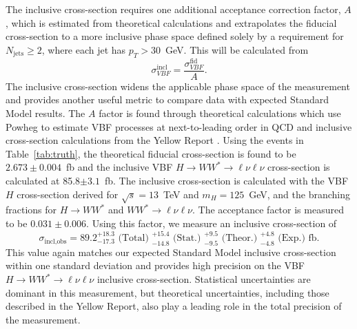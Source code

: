 The inclusive cross-section requires one additional acceptance correction factor, $A$, which is estimated from theoretical calculations and extrapolates the fiducial cross-section to a more inclusive phase space defined solely by a requirement for $N_{\text{jets}}\geq2$, where each jet has $p_T>30$~GeV. This will be calculated from
\begin{equation}
\sigma_{VBF}^{\text{incl}} = \frac{\sigma_{VBF}^{\text{fid}}}{A}.
\end{equation}
The inclusive cross-section widens the applicable phase space of the measurement and provides another useful metric to compare data with expected Standard Model results. The $A$ factor is found through theoretical calculations which use Powheg to estimate VBF processes at next-to-leading order in QCD and inclusive cross-section calculations from the Yellow Report \cite{LHCCrossSectionWG}. Using the events in Table~\ref{tab:truth}, the theoretical fiducial cross-section is found to be $2.673\pm0.004$~fb and the inclusive VBF $H\rightarrow WW^*\rightarrow \ell\nu\ell\nu$ cross-section is calculated at 85.8$\pm 3.1$~fb. The inclusive cross-section is calculated with the VBF $H$ cross-section derived for $\sqrt{s}=13$~TeV and $m_H=125$~GeV, and the branching fractions for $H\rightarrow WW^*$ and $WW^*\rightarrow\ell\nu\ell\nu$.  The acceptance factor is measured to be $0.031 \pm 0.006$. Using this factor, we measure an inclusive cross-section of
\begin{equation}
\sigma_{\text{incl,obs}} = 89.2^{+18.3}_{-17.3} \text{ (Total) } ^{+15.4}_{-14.8} \text{ (Stat.) } ^{+9.5}_{-9.5} \text{ (Theor.) } ^{+4.8}_{-4.8} \text{ (Exp.)} \text{ fb}.
\end{equation} 
This value again matches our expected Standard Model inclusive cross-section within one standard deviation and provides high precision on the VBF $H\rightarrow WW^*\rightarrow\ell\nu\ell\nu$ inclusive cross-section. Statistical uncertainties are dominant in this measurement, but theoretical uncertainties, including those described in the Yellow Report, also play a leading role in the total precision of the measurement.   
